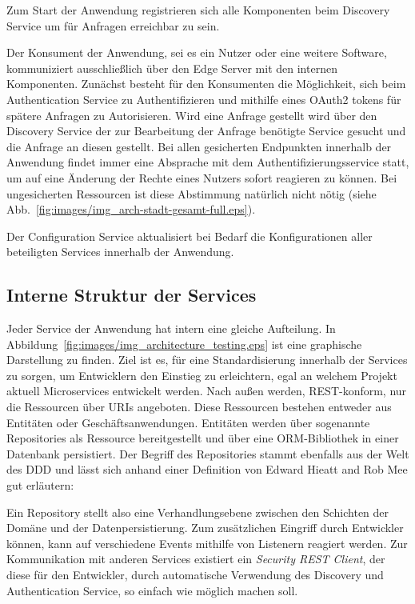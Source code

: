 \documentclass[12pt,a4paper,bibliography=totocnumbered,listof=totocnumbered]{scrartcl}
\begin{document}
Zum Start der Anwendung registrieren sich alle Komponenten beim Discovery Service um für Anfragen erreichbar zu sein.

Der Konsument der Anwendung, sei es ein Nutzer oder eine weitere Software, kommuniziert ausschließlich über den Edge Server mit den internen Komponenten. Zunächst besteht für den Konsumenten die Möglichkeit, sich beim Authentication Service zu Authentifizieren und mithilfe eines OAuth2 tokens für spätere Anfragen zu Autorisieren. Wird eine Anfrage gestellt wird über den Discovery Service der zur Bearbeitung der Anfrage benötigte Service gesucht und die Anfrage an diesen gestellt. Bei allen gesicherten Endpunkten innerhalb der Anwendung findet immer eine Absprache mit dem Authentifizierungsservice statt, um auf eine Änderung der Rechte eines Nutzers sofort reagieren zu können. Bei ungesicherten Ressourcen ist diese Abstimmung natürlich nicht nötig (siehe Abb.~\ref{fig:images/img_arch-stadt-gesamt-full.eps}).

Der Configuration Service aktualisiert bei Bedarf die Konfigurationen aller beteiligten Services innerhalb der Anwendung.


\subsection{Interne Struktur der Services}

Jeder Service der Anwendung hat intern eine gleiche Aufteilung. In Abbildung~\ref{fig:images/img_architecture_testing.eps} ist eine graphische Darstellung zu finden. Ziel ist es, für eine Standardisierung innerhalb der Services zu sorgen, um Entwicklern den Einstieg zu erleichtern, egal an welchem Projekt aktuell Microservices entwickelt werden. Nach außen werden, REST-konform, nur die Ressourcen über \acp{URI} angeboten. Diese Ressourcen bestehen entweder aus Entitäten oder Geschäftsanwendungen. Entitäten werden über sogenannte Repositories als Ressource bereitgestellt und über eine \ac{ORM}-Bibliothek in einer Datenbank persistiert. Der Begriff des Repositories stammt ebenfalls aus der Welt des \ac{DDD} und lässt sich anhand einer Definition von Edward Hieatt and Rob Mee gut erläutern\cite{hieatt}:


Ein Repository stellt also eine Verhandlungsebene zwischen den Schichten der Domäne und der Datenpersistierung.
Zum zusätzlichen Eingriff durch Entwickler können, kann auf verschiedene Events mithilfe von Listenern reagiert werden. Zur Kommunikation mit anderen Services existiert ein \textit{Security REST Client}, der diese für den Entwickler, durch automatische Verwendung des Discovery und Authentication Service, so einfach wie möglich machen soll. 
\end{document}
